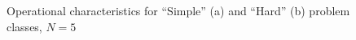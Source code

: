 \documentclass[review]{elsarticle}
\begin{document}
\begin{figure}[h!]
	\begin{minipage}[h]{0.48\linewidth}
	\end{minipage}
	\hfill
	\begin{minipage}[h]{0.48\linewidth}
	\end{minipage}
	\caption{Operational characteristics for “Simple” (a) and “Hard” (b) problem classes, $N = 5$}
	\label{fig:operational_characteristics_N=5}
\end{figure}
\end{document}
